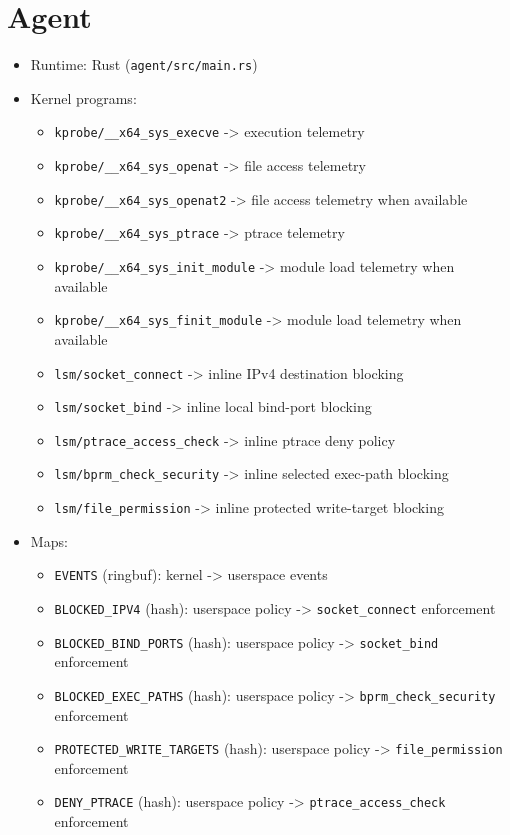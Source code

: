 \documentclass[
  12pt,
]{report}
\providecommand{\tightlist}{%
  \setlength{\itemsep}{0pt}\setlength{\parskip}{0pt}}
\begin{document}
\section{Agent}\label{agent}

\begin{itemize}
\tightlist
\item
  Runtime: Rust (\texttt{agent/src/main.rs})
\item
  Kernel programs:

  \begin{itemize}
  \tightlist
  \item
    \texttt{kprobe/\_\_x64\_sys\_execve} -\textgreater{} execution
    telemetry
  \item
    \texttt{kprobe/\_\_x64\_sys\_openat} -\textgreater{} file access
    telemetry
  \item
    \texttt{kprobe/\_\_x64\_sys\_openat2} -\textgreater{} file access
    telemetry when available
  \item
    \texttt{kprobe/\_\_x64\_sys\_ptrace} -\textgreater{} ptrace
    telemetry
  \item
    \texttt{kprobe/\_\_x64\_sys\_init\_module} -\textgreater{} module
    load telemetry when available
  \item
    \texttt{kprobe/\_\_x64\_sys\_finit\_module} -\textgreater{} module
    load telemetry when available
  \item
    \texttt{lsm/socket\_connect} -\textgreater{} inline IPv4 destination
    blocking
  \item
    \texttt{lsm/socket\_bind} -\textgreater{} inline local bind-port
    blocking
  \item
    \texttt{lsm/ptrace\_access\_check} -\textgreater{} inline ptrace
    deny policy
  \item
    \texttt{lsm/bprm\_check\_security} -\textgreater{} inline selected
    exec-path blocking
  \item
    \texttt{lsm/file\_permission} -\textgreater{} inline protected
    write-target blocking
  \end{itemize}
\item
  Maps:

  \begin{itemize}
  \tightlist
  \item
    \texttt{EVENTS} (ringbuf): kernel -\textgreater{} userspace events
  \item
    \texttt{BLOCKED\_IPV4} (hash): userspace policy -\textgreater{}
    \texttt{socket\_connect} enforcement
  \item
    \texttt{BLOCKED\_BIND\_PORTS} (hash): userspace policy
    -\textgreater{} \texttt{socket\_bind} enforcement
  \item
    \texttt{BLOCKED\_EXEC\_PATHS} (hash): userspace policy
    -\textgreater{} \texttt{bprm\_check\_security} enforcement
  \item
    \texttt{PROTECTED\_WRITE\_TARGETS} (hash): userspace policy
    -\textgreater{} \texttt{file\_permission} enforcement
  \item
    \texttt{DENY\_PTRACE} (hash): userspace policy -\textgreater{}
    \texttt{ptrace\_access\_check} enforcement
  \end{itemize}
\end{itemize}
\end{document}
